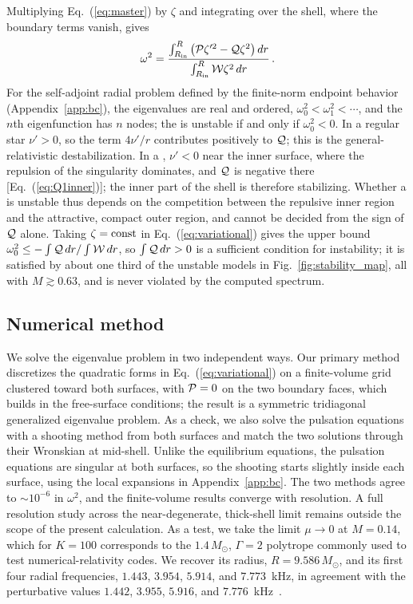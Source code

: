 \documentclass[%
 reprint,
 amsmath,amssymb,
 aps,prd,
 superscriptaddress,
]{revtex4-2}
\begin{document}
Multiplying Eq.~(\ref{eq:master}) by $\zeta$ and integrating over the shell, where the boundary terms vanish, gives
\begin{equation}
\omega^2 = \frac{\int_{R_{\rm in}}^{R}\left({\cal P}\zeta'^2-{\cal Q}\zeta^2\right)dr}{\int_{R_{\rm in}}^{R}{\cal W}\zeta^2\,dr}\,.
\label{eq:variational}
\end{equation}
For the self-adjoint radial problem defined by the finite-norm endpoint behavior (Appendix~\ref{app:bc}), the eigenvalues are real and ordered, $\omega_0^2<\omega_1^2<\cdots$, and the $n$th eigenfunction has $n$ nodes; the \singu{} is unstable if and only if $\omega_0^2<0$. In a regular star $\nu'>0$, so the term $4\nu'/r$ contributes positively to ${\cal Q}$; this is the general-relativistic destabilization. In a \singu{}, $\nu'<0$ near the inner surface, where the repulsion of the singularity dominates, and ${\cal Q}$ is negative there [Eq.~(\ref{eq:Q1inner})]; the inner part of the shell is therefore stabilizing. Whether a \singu{} is unstable thus depends on the competition between the repulsive inner region and the attractive, compact outer region, and cannot be decided from the sign of ${\cal Q}$ alone. Taking $\zeta={\rm const}$ in Eq.~(\ref{eq:variational}) gives the upper bound $\omega_0^2\le-\int{\cal Q}\,dr/\int{\cal W}\,dr$, so $\int{\cal Q}\,dr>0$ is a sufficient condition for instability; it is satisfied by about one third of the unstable models in Fig.~\ref{fig:stability_map}, all with $M\gtrsim0.63$, and is never violated by the computed spectrum.

\subsection{Numerical method}

We solve the eigenvalue problem in two independent ways. Our primary method discretizes the quadratic forms in Eq.~(\ref{eq:variational}) on a finite-volume grid clustered toward both surfaces, with ${\cal P}=0$ on the two boundary faces, which builds in the free-surface conditions; the result is a symmetric tridiagonal generalized eigenvalue problem. As a check, we also solve the pulsation equations with a shooting method from both surfaces and match the two solutions through their Wronskian at mid-shell. Unlike the equilibrium equations, the pulsation equations are singular at both surfaces, so the shooting starts slightly inside each surface, using the local expansions in Appendix~\ref{app:bc}. The two methods agree to $\sim10^{-6}$ in $\omega^2$, and the finite-volume results converge with resolution. A full resolution study across the near-degenerate, thick-shell limit remains outside the scope of the present calculation. As a test, we take the limit $\mu\to0$ at $M=0.14$, which for $K=100$ corresponds to the $1.4\,M_\odot$, $\Gamma=2$ polytrope commonly used to test numerical-relativity codes. We recover its radius, $R=9.586\,M_\odot$, and its first four radial frequencies, $1.443$, $3.954$, $5.914$, and $7.773$~kHz, in agreement with the perturbative values $1.442$, $3.955$, $5.916$, and $7.776$~kHz~\cite{Font2002}.
\end{document}
